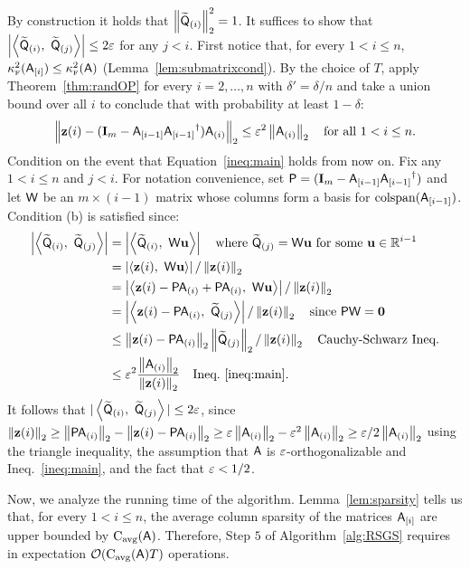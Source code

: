%
By construction it holds that $\norm{\tqc{i}}^2 = 1$. It suffices to show that $\left|\ip{\tqc{i}}{\tqc{j}}\right| \leq 2\eps$ for any $j<i$. First notice that, for every $1< i\leq n$, $\kappaFS(\matA_{[i]}) \leq \kappaFS(\matA)$ (Lemma~\ref{lem:submatrixcond}). By the choice of $T$, apply Theorem~\ref{thm:randOP} for every $i=2,\ldots ,n$ with $\delta' = \delta/n$ and take a union bound over all $i$ to conclude that with probability at least $1-\delta$:
\begin{align}\label{ineq:main}
	\norm{\z (i) - (\matI_m- \matA_{[i-1]} \pinv{\matA_{[i-1]}}) \ac{i} } \leq \eps^2 \norm{ \ac{i}}\quad \text{for all }1<i\leq n.
\end{align}
Condition on the event that Equation~\eqref{ineq:main} holds from now on. Fix any $1<i\leq n $ and $j<i$. For notation convenience, set $\matP = (\matI_m- \matA_{[i-1]} \pinv{\matA_{[i-1]}})$ and let $\matW$ be an $m\times (i-1)$ matrix whose columns form a basis for $\text{colspan}(\matA_{[i-1]})$. Condition (b) is satisfied since:
\begin{align*}
\left|\ip{\tqc{i}}{ \tqc{j}}\right| &   =   \left|\ip{\tqc{i}}{ \matW \u}\right| \quad\text{where }\tqc{j} = \matW \u \text{ for some }\u\in \RR^{i-1}\\
 						   &   =   \left|\ip{\z(i)}{ \matW \u}\right| / \norm{\z(i)} \\
 						   &   =   \left|\ip{\z(i) - \matP \ac{i} + \matP \ac{i} }{ \matW \u}\right| / \norm{\z(i)} \\
 						   &   =   \left|\ip{\z(i) - \matP \ac{i}}{ \tqc{j}}\right| / \norm{\z(i)} \quad\text{since }\matP \matW = \zero\\
 						   & \leq  \norm{\z(i) - \matP \ac{i} } \norm{ \tqc{j}} / \norm{\z(i)} \quad \text{Cauchy-Schwarz Ineq.}\\
 						   & \leq  \eps^2 \frac{\norm{\ac{i} }}{ \norm{\z(i)}} \quad\text{Ineq.}~\eqref{ineq:main}.
\end{align*}
It follows that $|\ip{\tqc{i}}{ \tqc{j}} |\leq 2\eps $, since $\norm{\z(i)} \geq \norm{\matP \ac{i}} - \norm{\z(i) - \matP\ac{i}}\geq \eps \norm{\ac{i}} - \eps^2 \norm{\ac{i}} \geq \eps /2 \norm{\ac{i}}$
using the triangle inequality, the assumption that $\matA$ is $\eps$-orthogonalizable and Ineq.~\eqref{ineq:main}, and the fact that $\eps <1/2$.
%

%
Now, we analyze the running time of the algorithm. Lemma~\ref{lem:sparsity} tells us that, for every $1< i\leq n$, the average column sparsity of the matrices $\matA_{[i]}$ are upper bounded by $\cavg(\matA)$. Therefore, Step $5$ of Algorithm~\ref{alg:RSGS} requires in expectation $\OO(\cavg(\matA) T)$ operations.
%

